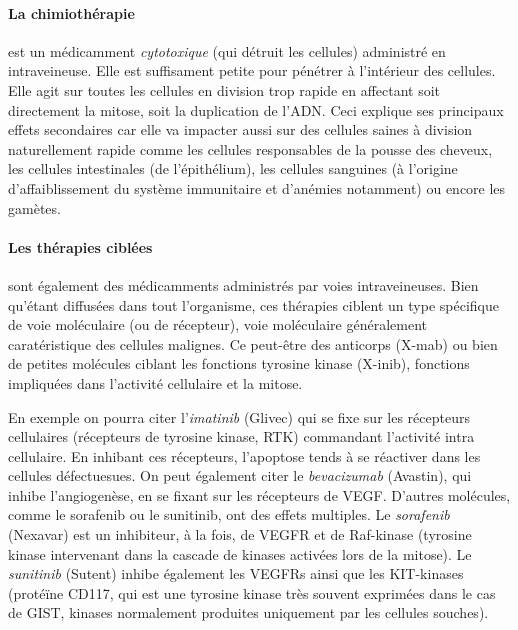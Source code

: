 \documentclass[main.tex]{subfiles}
\begin{document}
\paragraph{La chimiothérapie} est un médicamment \emph{cytotoxique} (\ie qui détruit les cellules) administré en intraveineuse. Elle est suffisament petite pour pénétrer à l'intérieur des cellules. Elle agit sur toutes les cellules en division trop rapide en affectant soit directement la mitose, soit la duplication de l'ADN. Ceci explique ses principaux effets secondaires car elle va impacter aussi sur des cellules saines à division naturellement rapide comme les cellules responsables de la pousse des cheveux, les cellules intestinales (de l'épithélium), les cellules sanguines (à l'origine d'affaiblissement du système immunitaire et d'anémies notamment) ou encore les gamètes.

\paragraph{Les thérapies ciblées} sont également des médicamments administrés par voies intraveineuses. Bien qu'étant diffusées dans tout l'organisme, ces thérapies  ciblent un type spécifique de voie moléculaire (ou de récepteur), voie moléculaire généralement caratéristique des cellules malignes. Ce peut-être des anticorps (X-mab) ou bien de petites molécules ciblant les fonctions tyrosine kinase (X-inib), fonctions impliquées dans l'activité cellulaire et la mitose. 

En exemple on pourra citer l'\emph{imatinib} (Glivec) qui se fixe sur les récepteurs cellulaires (récepteurs de tyrosine kinase, RTK) commandant l'activité intra cellulaire. En inhibant ces récepteurs, l'apoptose tends à se réactiver dans les cellules défectuesues. On peut également citer le \emph{bevacizumab} (Avastin), qui inhibe l'angiogenèse, en se fixant sur les récepteurs de VEGF. D'autres molécules, comme  le sorafenib ou le sunitinib, ont des effets multiples. 
Le \emph{sorafenib} (Nexavar) est un inhibiteur, à la fois, de VEGFR et de Raf-kinase (tyrosine kinase intervenant dans la cascade de kinases activées lors de la mitose). 
Le \emph{sunitinib} (Sutent) inhibe également les VEGFRs ainsi que les KIT-kinases (protéïne CD117, qui est une tyrosine kinase très souvent exprimées dans le cas de GIST, kinases normalement produites uniquement par les cellules souches).
\end{document}
